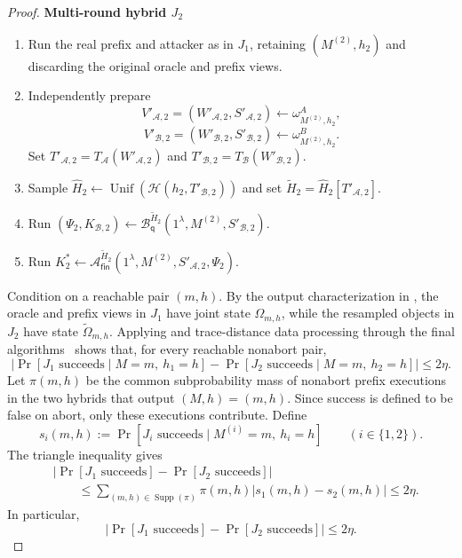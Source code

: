 \documentclass[11pt]{article}
\newcounter{algorithm}
\newcommand{\cA}{\mathcal{A}}
\newcommand{\cB}{\mathcal{B}}
\newcommand{\cH}{\mathcal{H}}
\newcommand{\Unif}{\operatorname{Unif}}
\newcommand{\Supp}{\operatorname{Supp}}
\newcommand{\changed}[1]{\textcolor{purple!75!black}{#1}}
\newcommand{\mrchanged}[1]{\changed{#1}}
\newenvironment{hybrid}[1]{%
  \par\medskip
  \noindent\textbf{#1}
  \begin{enumerate}[leftmargin=2.5em,label=\arabic*.,itemsep=0.25em,topsep=0.35em]
}{%
  \end{enumerate}
  \medskip
}
\begin{document}
\begin{proof}
\begin{hybrid}{Multi-round hybrid \(J_2\)}
  \item Run the real prefix and attacker as in \(J_1\), retaining
  \((M^{(2)},h_2)\) and discarding the original oracle and prefix views.
  \item \mrchanged{Independently prepare
  \[
    V'_{\cA,2}=(W'_{\cA,2},S'_{\cA,2})
      \leftarrow\omega^A_{M^{(2)},h_2},
  \]
  \[
    V'_{\cB,2}=(W'_{\cB,2},S'_{\cB,2})
      \leftarrow\omega^B_{M^{(2)},h_2}.
  \]
  Set \(T'_{\cA,2}=T_{\cA}(W'_{\cA,2})\) and
  \(T'_{\cB,2}=T_{\cB}(W'_{\cB,2})\).}
  \item \mrchanged{Sample
  \(\widehat H_2\leftarrow\Unif(\cH(h_2,T'_{\cB,2}))\) and set
  \(\widetilde H_2=\widehat H_2[T'_{\cA,2}]\).}
  \item Run
  \((\Psi_2,K_{\cB,2})\leftarrow
    \cB_{\mathsf q}^{\widetilde H_2}
    (1^\lambda,M^{(2)},S'_{\cB,2})\).
  \item Run
  \(K^*_2\leftarrow
    \cA_{\mathsf{fin}}^{\widetilde H_2}
    (1^\lambda,M^{(2)},S'_{\cA,2},\Psi_2)\).
\end{hybrid}

Condition on a reachable pair \((m,h)\). By the output characterization in
, the oracle and prefix views in \(J_1\)
have joint state \(\Omega_{m,h}\), while the resampled objects in \(J_2\)
have state \(\widetilde\Omega_{m,h}\). Applying
 and trace-distance data processing through the
final algorithms~\cite[Chapter~3]{Watrous18} shows that, for every reachable
nonabort pair,
\[
  \left|
    \Pr[J_1\text{ succeeds}\mid M=m,\ h_1=h]
    -
    \Pr[J_2\text{ succeeds}\mid M=m,\ h_2=h]
  \right|
  \le 2\eta.
\]
Let \(\pi(m,h)\) be the common subprobability mass of nonabort prefix
executions in the two hybrids that output \((M,h)=(m,h)\). Since success is
defined to be false on abort, only these executions contribute. Define
\[
  s_i(m,h)
  :=
  \Pr[J_i\text{ succeeds}\mid M^{(i)}=m,\ h_i=h]
  \qquad (i\in\{1,2\}).
\]
The triangle inequality gives
\[
  \begin{aligned}
  &\left|
    \Pr[J_1\text{ succeeds}]-\Pr[J_2\text{ succeeds}]
  \right|\\
  &\qquad\le
  \sum_{(m,h)\in\Supp(\pi)}\pi(m,h)
  \left|s_1(m,h)-s_2(m,h)\right|
  \le 2\eta.
  \end{aligned}
\]
In particular,
\begin{equation}
\label{eq:multi-j1-j2}
  \left|
    \Pr[J_1\text{ succeeds}]-\Pr[J_2\text{ succeeds}]
  \right|
  \le2\eta.
\end{equation}


\end{proof}
\end{document}
